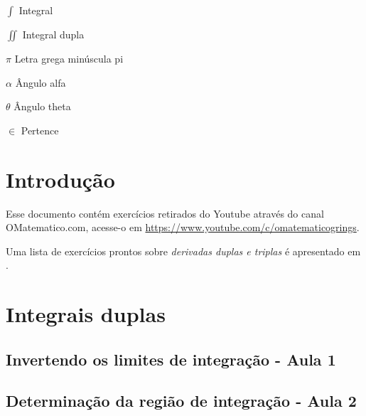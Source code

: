 \documentclass[
	12pt,				%
	openright,			%
	twoside,			%
	a4paper,			%
	english,			%
	french,				%
	spanish,			%
	brazil,				%
]{abntex2}
\begin{document}
\begin{simbolos}
	\item[$ \displaystyle\int $] Integral
	\item[$ \displaystyle\iint $] Integral dupla
	\item[$ \pi $] Letra grega minúscula pi
	\item[$ \alpha $] Ângulo alfa
	\item[$ \theta $] Ângulo theta
	\item[$ \in $] Pertence
\end{simbolos}

\tableofcontents*
\cleardoublepage


\textual

\chapter*[Introdução]{Introdução}

Esse documento contém exercícios retirados do Youtube através do canal OMatematico.com, acesse-o em \url{https://www.youtube.com/c/omatematicogrings}. 

Uma lista de exercícios prontos sobre \emph{derivadas duplas e triplas} é apresentado em .


\chapter{Integrais duplas}\label{integrais_duplas}

\section{Invertendo os limites de integração - Aula 1}			
			
\section{Determinação da região de integração - Aula 2}		
			
\end{document}
